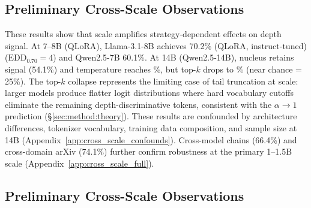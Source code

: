 \subsection{Preliminary Cross-Scale Observations}
\label{sec:gen:crossscale}

These results show that scale amplifies strategy-dependent effects on depth signal.
At 7--8B (QLoRA), Llama-3.1-8B \cite{llama3} achieves 70.2\% (QLoRA, instruct-tuned) ($\mathrm{EDD}_{0.70}{=}4$) and Qwen2.5-7B \cite{qwen2.5} 60.1\%.
At 14B (Qwen2.5-14B), nucleus retains signal (54.1\%) and temperature reaches \TEMPACCURACY{}\%, but top-$k$ drops to \TOPKACCURACY{}\% (near chance = 25\%).
The top-$k$ collapse represents the limiting case of tail truncation at scale: larger models produce flatter logit distributions where hard vocabulary cutoffs eliminate the remaining depth-discriminative tokens, consistent with the $\alpha \to 1$ prediction (\S\ref{sec:method:theory}).
These results are confounded by architecture differences, tokenizer vocabulary, training data composition, and sample size at 14B (Appendix~\ref{app:cross_scale_confounds}).
Cross-model chains (66.4\%) and cross-domain arXiv (74.1\%) further confirm robustness at the primary 1--1.5B scale (Appendix~\ref{app:cross_scale_full}).





\subsection{Preliminary Cross-Scale Observations}
\label{sec:gen:crossscale}

